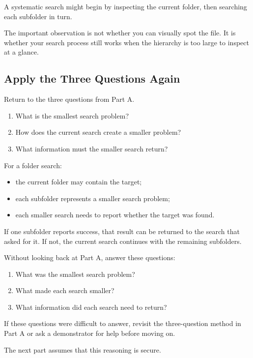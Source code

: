 \documentclass{csc2059practical}
\begin{document}
A systematic search might begin by inspecting the current folder, then
searching each subfolder in turn.

The important observation is not whether you can visually spot the file. It is
whether your search process still works when the hierarchy is too large to
inspect at a glance.

\clearpage

\subsection{Apply the Three Questions Again}

Return to the three questions from Part A.

\begin{enumerate}
    \item What is the smallest search problem?
    \item How does the current search create a smaller problem?
    \item What information must the smaller search return?
\end{enumerate}

For a folder search:

\begin{itemize}
    \item the current folder may contain the target;
    \item each subfolder represents a smaller search problem;
    \item each smaller search needs to report whether the target was found.
\end{itemize}

If one subfolder reports success, that result can be returned to the search
that asked for it. If not, the current search continues with the remaining
subfolders.


\begin{reflectionbox}
Without looking back at Part A, answer these questions:

\begin{enumerate}
    \item What was the smallest search problem?
    \item What made each search smaller?
    \item What information did each search need to return?
\end{enumerate}

If these questions were difficult to answer, revisit the three-question method
in Part A or ask a demonstrator for help before moving on.

The next part assumes that this reasoning is secure.
\end{reflectionbox}
\end{document}
